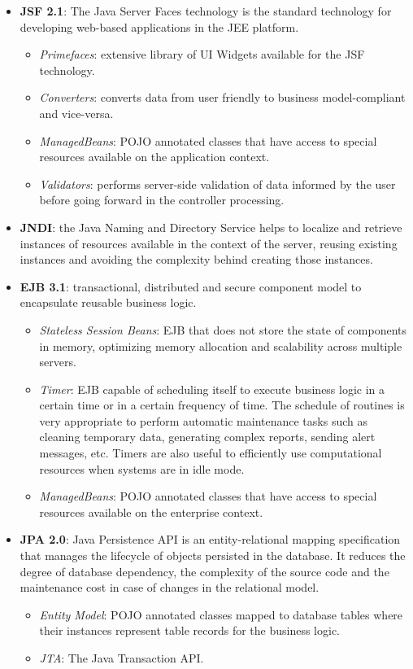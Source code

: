 \documentclass[envcountsame,envcountchap,letterpaper]{svmono}
\begin{document}
\begin{itemize}
\item \textbf{JSF 2.1}: The Java Server Faces technology is the standard technology for developing web-based applications in the JEE platform.
   \begin{itemize}
   \item \textit{Primefaces}: extensive library of UI Widgets 
   available for the JSF technology.
   \item \textit{Converters}: converts data from user friendly to
   business model-compliant and vice-versa.
   \item \textit{ManagedBeans}: POJO annotated classes that have
   access to special resources available on the
   application context.
   \item \textit{Validators}: performs server-side validation of
   data informed by the user before going forward in the
   controller processing.
   \end{itemize}
\item \textbf{JNDI}: the Java Naming and Directory Service helps to localize and retrieve instances of resources available in the context of the server, reusing existing instances and avoiding the complexity behind creating those instances.
\item \textbf{EJB 3.1}: transactional, distributed and secure component model to encapsulate reusable business logic.
   \begin{itemize}
   \item \textit{Stateless Session Beans}: EJB that does not store
   the state of components in memory, optimizing memory
   allocation and scalability across multiple servers.
   \item \textit{Timer}: EJB capable of scheduling itself to
   execute business logic in a certain time or in a
   certain frequency of time. The schedule of routines is
   very appropriate to perform automatic maintenance
   tasks such as cleaning temporary data, generating
   complex reports, sending alert messages, etc. Timers
   are also useful to efficiently use computational
   resources when systems are in idle mode.
   \item \textit{ManagedBeans}: POJO annotated classes that have
   access to  special resources available on the enterprise
   context.
   \end{itemize}
\item \textbf{JPA 2.0}: Java Persistence API is an entity-relational mapping specification that manages the lifecycle of objects persisted in the database. It reduces the degree of database dependency, the complexity of the source code and the maintenance cost in case of changes in the relational model.
   \begin{itemize}
   \item \textit{Entity Model}: POJO annotated classes mapped to
   database tables where their instances represent table records
   for the business logic.
   \item \textit{JTA}: The Java Transaction API.
   \end{itemize}
\end{itemize}
\end{document}
